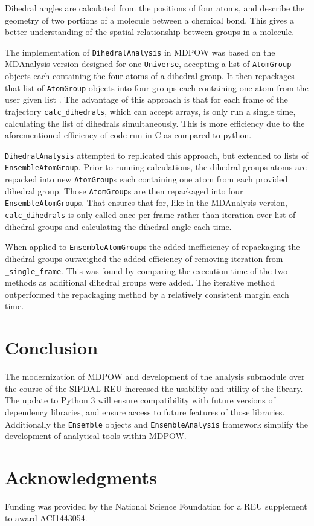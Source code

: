 \documentclass{article}[letterpaper, margins=1in, 12pt]
\begin{document}
Dihedral angles are calculated from the positions of four atoms, and describe the geometry of two portions of a molecule between a chemical bond. This gives a better understanding of the spatial relationship between groups in a molecule.   

The implementation of \texttt{DihedralAnalysis} in MDPOW was based on the MDAnalysis version designed for one \texttt{Universe}, accepting a list of \texttt{AtomGroup} objects each containing the four atoms of a dihedral group. It then repackages that list of \texttt{AtomGroup} objects into four groups each containing one atom from the user given list \cite{Mull2018}. The advantage of this approach is that for each frame of the trajectory \lstinline{calc_dihedrals}, which can accept arrays, is only run a single time, calculating the list of dihedrals simultaneously. This is more efficiency due to the aforementioned efficiency of code run in C as compared to python.

\texttt{DihedralAnalysis} attempted to replicated this approach, but extended to lists of \texttt{EnsembleAtomGroup}. Prior to running calculations, the dihedral groups atoms are repacked into new \texttt{AtomGroup}s each containing one atom from each provided dihedral group. Those \texttt{AtomGroup}s are then repackaged into four \texttt{EnsembleAtomGroup}s. That ensures that for, like in the MDAnalysis version, \lstinline{calc_dihedrals} is only called once per frame rather than iteration over list of dihedral groups and calculating the dihedral angle each time.

When applied to \texttt{EnsembleAtomGroup}s the added inefficiency of repackaging the dihedral groups outweighed the added efficiency of removing iteration from \lstinline{_single_frame}. This was found by comparing the execution time of the two methods as additional dihedral groups were added. The iterative method outperformed the repackaging method by a relatively consistent margin each time.

\section{Conclusion}
The modernization of MDPOW and development of the analysis submodule over the course of the SIPDAL REU increased the usability and utility of the library. The update to Python 3 will ensure compatibility with future versions of dependency libraries, and ensure access to future features of those libraries. Additionally the \texttt{Ensemble} objects and \texttt{EnsembleAnalysis} framework simplify the development of analytical tools within MDPOW.

\section*{Acknowledgments}
Funding was provided by the National Science Foundation for a REU supplement to award ACI1443054. 

\printbibliography
\end{document}
